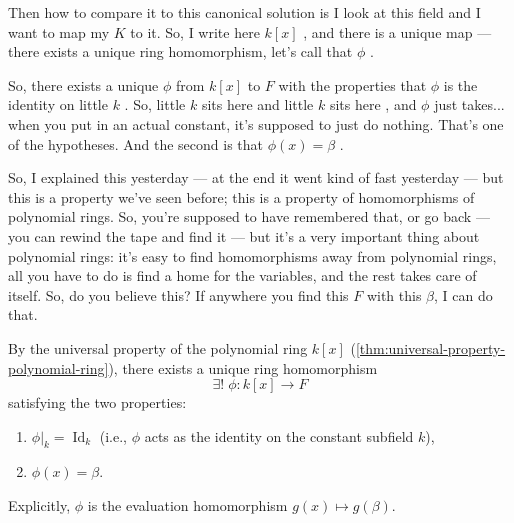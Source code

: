 \begin{hidden}
\end{hidden}

\begin{speech}[00:12:34 - 00:14:17]
Then how to compare it to this canonical solution is I look at this field and I want to map my $K$ to it. So, I write here $k[x]$ , and there is a unique map --- there exists a unique ring homomorphism, let's call that $\phi$ .

So, there exists a unique $\phi$ from $k[x]$ to $F$ with the properties that $\phi$ is the identity on little $k$ . So, little $k$ sits here  and little $k$ sits here , and $\phi$ just takes... when you put in an actual constant, it's supposed to just do nothing. That's one of the hypotheses. And the second is that $\phi(x) = \beta$ .

So, I explained this yesterday --- at the end it went kind of fast yesterday --- but this is a property we've seen before; this is a property of homomorphisms of polynomial rings. So, you're supposed to have remembered that, or go back --- you can rewind the tape and find it --- but it's a very important thing about polynomial rings: it's easy to find homomorphisms away from polynomial rings, all you have to do is find a home for the variables, and the rest takes care of itself. So, do you believe this? If anywhere you find this $F$ with this $\beta$, I can do that.
\end{speech}

\begin{content}
By the universal property of the polynomial ring $k[x]$ (\cref{thm:universal-property-polynomial-ring}), there exists a unique ring homomorphism
\[
\exists! \; \phi \colon k[x] \to F
\]
satisfying the two properties:
\begin{enumerate}[label=\textbf{(\arabic*)}]
    \item $\phi|_k = \operatorname{Id}_k$ (i.e., $\phi$ acts as the identity on the constant subfield $k$),
    \item $\phi(x) = \beta$.
\end{enumerate}
Explicitly, $\phi$ is the evaluation homomorphism $g(x) \mapsto g(\beta)$.
\end{content}

